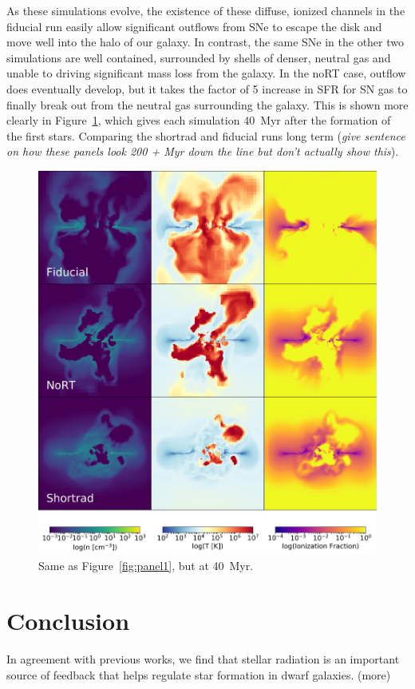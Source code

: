 \documentclass[twocolumn]{aastex62}
\begin{document}
As these simulations evolve, the existence of these diffuse, ionized channels in the fiducial run easily allow significant outflows from SNe to escape the disk and move well into the halo of our galaxy. In contrast, the same SNe in the other two simulations are well contained, surrounded by shells of denser, neutral gas and unable to driving significant mass loss from the galaxy. In the noRT case, outflow does eventually develop, but it takes the factor of 5 increase in SFR for SN gas to finally break out from the neutral gas surrounding the galaxy. This is shown more clearly in Figure~\ref{fig:panel2}, which gives each simulation 40~Myr after the formation of the first stars. Comparing the shortrad and fiducial runs long term (\textit{give sentence on how these panels look 200 + Myr down the line but don't actually show this}).

\begin{figure}
\centering
\includegraphics[width=0.99\linewidth]{DD0160_fiducial_shortrad_nort}
\caption{Same as Figure~\ref{fig:panel1}, but at 40~Myr.}
\label{fig:panel2}
\end{figure}

\section{Conclusion}  \label{sec:conclusion}
In agreement with previous works, we find that stellar radiation is an important source of feedback that helps regulate star formation in dwarf galaxies. (more)
\end{document}
